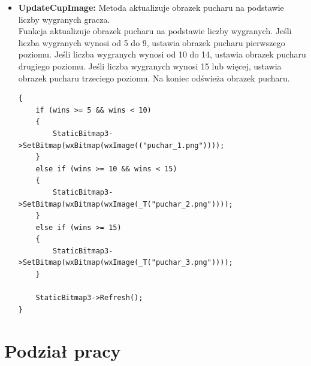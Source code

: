 \documentclass[]{report}
\begin{document}
\begin{itemize}
\begin{itemize}
\begin{lstlisting}
	}
}
			\end{lstlisting}
		\end{itemize}
	\newpage
		\item \textbf{UpdateCupImage:} Metoda aktualizuje obrazek pucharu na podstawie liczby wygranych gracza.
		\vspace{0.25cm}
\\Funkcja aktualizuje obrazek pucharu na podstawie liczby wygranych. Jeśli liczba wygranych wynosi od 5 do 9, ustawia obrazek pucharu pierwszego poziomu. Jeśli liczba wygranych wynosi od 10 do 14, ustawia obrazek pucharu drugiego poziomu. Jeśli liczba wygranych wynosi 15 lub więcej, ustawia obrazek pucharu trzeciego poziomu. Na koniec odświeża obrazek pucharu.
\vspace{0.2cm}
			\begin{lstlisting}
{
	if (wins >= 5 && wins < 10)
	{
		StaticBitmap3->SetBitmap(wxBitmap(wxImage(("puchar_1.png"))));
	}
	else if (wins >= 10 && wins < 15)
	{
		StaticBitmap3->SetBitmap(wxBitmap(wxImage(_T("puchar_2.png"))));
	}
	else if (wins >= 15)
	{
		StaticBitmap3->SetBitmap(wxBitmap(wxImage(_T("puchar_3.png"))));
	}
	
	StaticBitmap3->Refresh();
}
			\end{lstlisting}
\end{itemize}
	
	\newpage

	\section*{Podział pracy}
	
\end{document}
